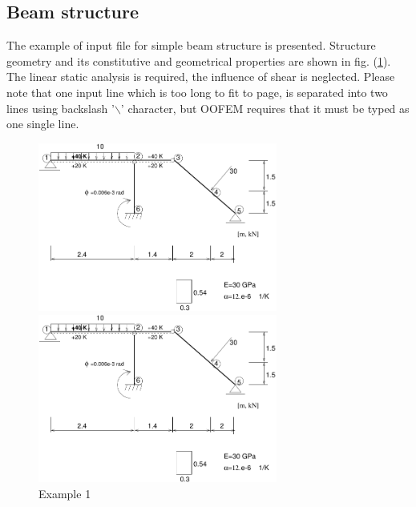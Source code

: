 \documentclass[a4paper]{article}
\begin{document}
\subsection {Beam structure}
The example of input file for simple beam structure is presented.
Structure geometry and its constitutive and geometrical properties are
shown in fig. (\ref{ex01}). The linear static analysis is required,
the influence of shear is neglected. Please note that one input line
which is too long to fit to page, is separated into two lines using
backslash '$\backslash$' character, but OOFEM requires that it must be typed as one single line.
\begin{figure}[htb]
\begin{htmlonly}
  \centerline{\includegraphics[width=0.7\textwidth]{ex01}}
\end{htmlonly}
\centerline{\includegraphics[width=0.7\textwidth]{ex01}}
\caption{Example 1}
\label{ex01}

\end{figure}
\end{document}
